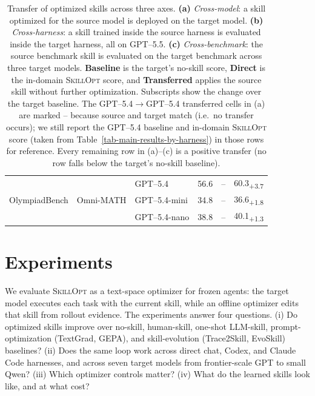 \documentclass[
]{article}
\providecommand{\mrowcell}{}
\newcommand{\ourmethod}{\textsc{SkillOpt}\xspace}
\newcommand{\na}{--}
\newcommand{\dvalp}[2]{\hphantom{\textsubscript{+#2}}#1\textsubscript{\textcolor{deltapos}{+#2}}}
\begin{document}
\begin{table}[t]
{\begin{tabular}{l l l c c c}
\midrule
\multirow{3}{*}{OlympiadBench} & \multirow{3}{*}{Omni-MATH} & GPT--5.4      & 56.6 & \na & \dvalp{60.3}{3.7} \\
\mrowcell & \mrowcell & GPT--5.4-mini & 34.8 & \na & \dvalp{36.6}{1.8} \\
\mrowcell & \mrowcell & GPT--5.4-nano & 38.8 & \na & \dvalp{40.1}{1.3} \\
\bottomrule
\end{tabular}%
}
\caption{Transfer of optimized skills across three axes. \textbf{(a)} \emph{Cross-model}: a skill optimized for the source model is deployed on the target model. \textbf{(b)} \emph{Cross-harness}: a skill trained inside the source harness is evaluated inside the target harness, all on GPT--5.5. \textbf{(c)} \emph{Cross-benchmark}: the source benchmark skill is evaluated on the target benchmark across three target models. \textbf{Baseline} is the target's no-skill score, \textbf{Direct} is the in-domain \ourmethod{} score, and \textbf{Transferred} applies the source skill without further optimization. Subscripts show the change over the target baseline. The GPT--5.4{$\to$}GPT--5.4 transferred cells in (a) are marked \na{} because source and target match (i.e.\ no transfer occurs); we still report the GPT--5.4 baseline and in-domain \ourmethod{} score (taken from Table~\ref{tab-main-results-by-harness}) in those rows for reference. Every remaining row in (a)--(c) is a positive transfer (no row falls below the target's no-skill baseline).}
\label{tab-transfer-all}
\label{tab-transfer-cross-model}
\label{tab-transfer-cross-harness}
\label{tab-transfer-cross-benchmark}
\end{table}

\section{Experiments}\label{sec-experiments}

We evaluate \ourmethod{} as a text-space optimizer for frozen agents:
the target model executes each task with the current skill, while an
offline optimizer edits that skill from rollout evidence. The
experiments answer four questions. (i) Do optimized skills improve over
no-skill, human-skill, one-shot LLM-skill, prompt-optimization
(TextGrad, GEPA), and skill-evolution (Trace2Skill, EvoSkill) baselines?
(ii) Does the same loop work across direct chat, Codex, and Claude Code
harnesses, and across seven target models from frontier-scale GPT to
small Qwen? (iii) Which optimizer controls matter? (iv) What do the
learned skills look like, and at what cost?
\end{document}
